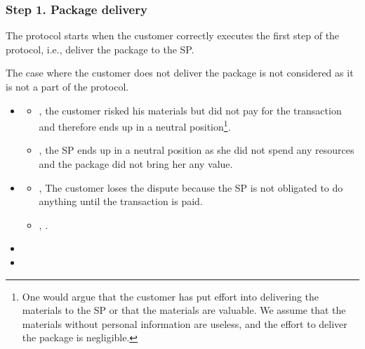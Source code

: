 \newcommand{\CustomerLosesBeforePayment}{The customer loses the dispute because the SP is not obligated to do anything until the transaction is paid}
\newcommand{\CustomerLosesBeforePoP}{The customer loses the dispute because the SP still can publish the PoP within the agreed timeframe}

\newcommand{\RemainsIn}[2]{The #1 remains in the #2 position}

\subsubsection*{Step 1. \CustomerTurn{} Package delivery}\label{step-1-deliver-package}

The protocol starts when the customer correctly executes the first step of the protocol, i.e., deliver the package to the SP. 

The case where the customer does not deliver the package is not considered as it is not a part of the protocol.

\begin{itemize}
\item \AgreeablePath
  \begin{itemize}
    \item  {}, the customer risked his materials but did not pay for the transaction and therefore ends up in a neutral position\footnote{One would argue that the customer has put effort into delivering the materials to the SP or that the materials are valuable. We assume that the materials without personal information are useless, and the effort to deliver the package is negligible.}.
    \item {}, the SP ends up in a neutral position as she did not spend any resources and the package did not bring her any value.
  \end{itemize}
\item \DisputePath
  \begin{itemize}
    \item {}, \CustomerLosesBeforePayment{}.
    \item {}, .
  \end{itemize}
\end{itemize}

\Fairness

\begin{itemize}
  \item {}
  \item {}
\end{itemize}

